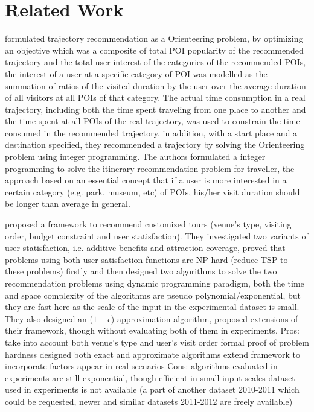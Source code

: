 \section{Related Work}
\label{relatedwork}
\cite{ijcai15} formulated trajectory recommendation as a Orienteering problem,
by optimizing an objective which was a composite of total POI popularity of the recommended trajectory
and the total user interest of the categories of the recommended POIs, the interest of a user at a specific 
category of POI was modelled as the summation of ratios of the visited duration by the user over the average 
duration of all visitors at all POIs of that category. The actual time consumption in a real trajectory, including
both the time spent traveling from one place to another and the time spent at all POIs of the real trajectory,
was used to constrain the time consumed in the recommended trajectory, in addition, with a start place and a 
destination specified, they recommended a trajectory by solving the Orienteering problem using integer programming.
%
The authors formulated a integer programming to solve the itinerary recommendation problem for traveller, the approach based on an essential concept that if a user is more interested in a certain category (e.g. park, museum, etc) of POIs, his/her visit duration should be longer than average in general.


\cite{wsdm14} proposed a framework to recommend customized tours (venue's type, visiting order, budget constraint and user statisfaction). They investigated two variants of user statisfaction, i.e. additive benefits and attraction coverage, proved that problems using both user satisfaction functions are NP-hard (reduce TSP to these problems) firstly and then designed two algorithms to solve the two recommendation problems using dynamic programming paradigm, both the time and space complexity of the algorithms are pseudo polynomial/exponential, but they are fast here as the scale of the input in the experimental dataset is small. They also designed an ($1-\epsilon$) approximation algorithm, proposed extensions of their framework, though without evaluating both of them in experiments.
Pros:
take into account both venue's type and user's visit order
formal proof of problem hardness
designed both exact and approximate algorithms
extend framework to incorporate factors appear in real scenarios
Cons:
algorithms evaluated in experiments are still exponential, though efficient in small input scales
dataset used in experiments is not available (a part of another dataset 2010-2011 which could be requested, newer and similar datasets 2011-2012 are freely available)

\cite{tripbuilder15}

\cite{tripplanner15}

\cite{ht14}

\cite{geophoto13}

\cite{travel13}

\cite{transit15}
